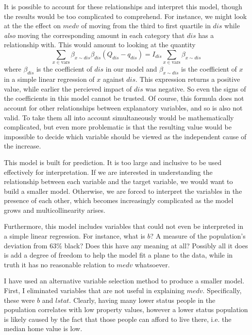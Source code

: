 \documentclass[12pt]{article}
\begin{document}
It is possible to account for these relationships and interpret this model, though the results would be too complicated to comprehend.  For instance, we might look at the the effect on $medv$ of moving from the third to first quartile in $dis$ while \emph{also} moving the corresponding amount in each category that $dis$ has a relationship with.  This would amount to looking at the quantity
$$
\sum_{x \in \text{vars}} \beta_{x \sim dis} \beta_{dis} (Q_{dis} - q_{dis})
=
I_{dis} \sum_{x \in \text{vars}} \beta_{x \sim dis}
$$
where $\beta_{dis}$ is the coefficient of $dis$ in our model and $\beta_{x \sim dis}$ is the coefficient of $x$ in a simple linear regression of $x$ against $dis$.  This expression returns a positive value, while earlier the percieved impact of $dis$ was negative.  So even the signs of the coefficients in this model cannot be trusted.  Of course, this formula does not account for other relationships between explanatory variables, and so is also not valid.  To take them all into account simultaneously would be mathematically complicated, but even more problematic is that the resulting value would be impossible to decide which variable should be viewed as the independent cause of the increase.

This model is built for prediction.  It is too large and inclusive to be used effectively for interpretation.  If we are interested in understanding the relationship between each variable and the target variable, we would want to build a smaller model.  Otherwise, we are forced to interpret the variables in the presence of each other, which becomes increasingly complicated as the model grows and multicollinearity arises.

Furthermore, this model includes variables that could not even be interpreted in a simple linear regression.  For instance, what is $b$?  A measure of the population's deviation from $63 \%$ black?  Does this have any meaning at all?  Possibly all it does is add a degree of freedom to help the model fit a plane to the data, while in truth it has no reasonable relation to $medv$ whatsoever.

I have used an alternative variable selection method to produce a smaller model.  First, I eliminated variables that are not useful in explaining $medv$.  Specifically, these were $b$ and $lstat$.  Clearly, having many lower status people in the population correlates with low property values, however a lower status population is likely caused by the fact that those people can afford to live there, i.e. the median home value is low.
\end{document}
